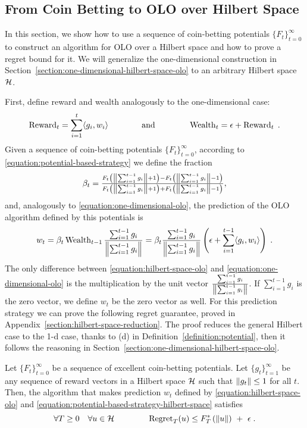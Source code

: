 \subsection{From Coin Betting to OLO over Hilbert Space}
\label{section:reduction_hilbert}

In this section, we show how to use a sequence of coin-betting potentials $\{F_t\}_{t=0}^\infty$
to construct an algorithm for \ac{OLO} over a Hilbert space
and how to prove a regret bound for it.
We will generalize the one-dimensional construction in Section~\ref{section:one-dimensional-hilbert-space-olo} to an arbitrary
Hilbert space $\mathcal{H}$.

First, define reward and wealth analogously
to the one-dimensional case:
\vspace{-0.1cm}
\[
\operatorname{Reward}_t = \sum_{i=1}^t \langle g_i, w_i \rangle
\qquad \qquad \text{and} \qquad \qquad
\operatorname{Wealth}_t = \epsilon + \operatorname{Reward}_t \; .
\]
Given a sequence of coin-betting potentials $\{F_t\}_{t=0}^\infty$, according to \eqref{equation:potential-based-strategy}
we define the fraction
\begin{equation}
\label{equation:potential-based-strategy-hilbert-space}
\beta_t = \tfrac{F_t \left(\left\|{\sum_{i=1}^{t-1} g_i}\right\| + 1\right) - F_t\left(\left\|{\sum_{i=1}^{t-1} g_i}\right\| - 1 \right)}{F_t\left(\left\|{\sum_{i=1}^{t-1} g_i}\right\| + 1 \right) + F_t\left(\left\|{\sum_{i=1}^{t-1} g_i}\right\| - 1 \right)},
\end{equation}
and, analogously to \eqref{equation:one-dimensional-olo}, the prediction of the OLO algorithm
defined by this potentials is
\begin{equation}
\label{equation:hilbert-space-olo}
w_t = \beta_t \operatorname{Wealth}_{t-1} \frac{\sum_{i=1}^{t-1} g_i}{\left\|{\sum_{i=1}^{t-1} g_i}\right\|}
= \beta_t \frac{\sum_{i=1}^{t-1} g_i}{\left\|{\sum_{i=1}^{t-1} g_i}\right\|} \left(\epsilon+ \sum_{i=1}^{t-1} \langle g_i, w_i\rangle \right) \; .
\end{equation}
The only difference between \eqref{equation:hilbert-space-olo} and
\eqref{equation:one-dimensional-olo} is the multiplication by the unit vector
$\frac{\sum_{i=1}^{t-1} g_i}{\left\|{\sum_{i=1}^{t-1} g_i}\right\|}$. If $\sum_{i=1}^{t-1}
g_i$ is the zero vector, we define $w_t$ be the zero vector as well.
For this prediction strategy we can prove the following regret guarantee, proved in Appendix~\ref{section:hilbert-space-reduction}.
The proof reduces the general Hilbert case to the 1-d case, thanks to (d) in Definition~\ref{definition:potential}, then it follows the  reasoning in Section~\ref{section:one-dimensional-hilbert-space-olo}.
%
\begin{theorem}
\label{theorem:hilbert-space-olo-regret-bound}
Let $\{F_t\}_{t=0}^\infty$ be a sequence of excellent coin-betting potentials.
Let $\{g_t\}_{t=1}^\infty$ be any sequence of reward vectors in a Hilbert space
$\mathcal{H}$ such that $\left\|{g_t}\right\| \le 1$ for all $t$. Then, the algorithm that makes
prediction $w_t$ defined by \eqref{equation:hilbert-space-olo} and
\eqref{equation:potential-based-strategy-hilbert-space} satisfies
\[
\forall T \ge 0 \quad
\forall u \in \mathcal{H} \qquad \qquad
\operatorname{Regret}_T(u) \le F_T^*\left(\left\|{u}\right\| \right) \ + \ \epsilon \; .
\]
\end{theorem}

